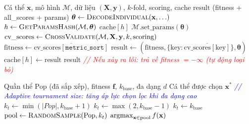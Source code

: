 \documentclass[12pt,a4paper]{article}
\newcommand{\argmax}{\operatornamewithlimits{argmax}}
\begin{document}
\begin{algorithm}[H]
\caption{Đánh giá fitness cá thể có cache (\textsc{EvaluateIndividual})}
\label{alg:ga_eval}
\begin{algorithmic}[1]
\Require Cá thể $\mathbf{x}$, mô hình $\mathcal{M}$, dữ liệu $(\mathbf{X}, \mathbf{y})$, $k$-fold, scoring, cache
\Ensure $\text{result}$ (fitness + all\_scores + params)
\State $\boldsymbol{\theta} \gets \textsc{DecodeIndividual}(\mathbf{x}, \ldots)$
\State $h \gets \textsc{GetParamsHash}(\mathcal{M}, \boldsymbol{\theta})$
    \State \Return $\text{cache}[h]$ 
\EndIf
\State $\mathcal{M}.\text{set\_params}(\boldsymbol{\theta})$
\State $\text{cv\_scores} \gets \textsc{CrossValidate}(\mathcal{M}, \mathbf{X}, \mathbf{y}, k, \text{scoring})$
\State $\text{fitness} \gets \overline{\text{cv\_scores}[\texttt{metric\_sort}]}$
\State $\text{result} \gets (\text{fitness}, \{\text{key}: \overline{\text{cv\_scores}[\text{key}]}\}, \boldsymbol{\theta})$
\State $\text{cache}[h] \gets \text{result}$
\State \Return result
\Statex \textcolor{red}{\textit{// Nếu xảy ra lỗi: trả về fitness $= -\infty$ (tự động loại bỏ)}}
\end{algorithmic}
\end{algorithm}

\begin{algorithm}[H]
\caption{Chọn lọc tournament thích nghi (\textsc{AdaptiveTournamentSelection})}
\label{alg:ga_tournament}
\begin{algorithmic}[1]
\Require Quần thể $\text{Pop}$ (đã sắp xếp), fitness $\mathbf{f}$, $k_{\text{base}}$, đa dạng $d$
\Ensure Cá thể được chọn $\mathbf{x}^*$
\Statex \textcolor{blue}{\textit{// Adaptive tournament size: tăng áp lực chọn lọc khi đa dạng cao}}
    \State $k_t \gets \min(|Pop|, k_{\text{base}} + 1)$
    \State $k_t \gets \max(2, k_{\text{base}} - 1)$ 
\Else
    \State $k_t \gets k_{\text{base}}$
\EndIf
\State $\text{pool} \gets \textsc{RandomSample}(\text{Pop}, k_t)$
\State \Return $\argmax_{\mathbf{x} \in \text{pool}} f(\mathbf{x})$
\end{algorithmic}
\end{algorithm}
\end{document}
